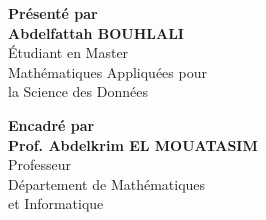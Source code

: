 \documentclass[12pt,a4paper]{report}
\begin{document}
\begin{titlepage}
    \begin{center}
        \begin{minipage}[t]{0.4\textwidth}
            \centering
            \colorbox{lightblue!30}{
                \begin{minipage}{0.9\textwidth}
                    \centering
                    \vspace{0.3cm}
                    \textbf{\color{blueuniv}Présenté par}\\
                    \vspace{0.2cm}
                    {\large \textbf{Abdelfattah BOUHLALI}}\\
                    \vspace{0.1cm}
                    \small Étudiant en Master\\
                    Mathématiques Appliquées pour\\
                    la Science des Données\\
                    \vspace{0.3cm}
                \end{minipage}
            }
        \end{minipage}%
        \hfill
        \begin{minipage}[t]{0.4\textwidth}
            \centering
            \colorbox{blueuniv!10}{
                \begin{minipage}{0.9\textwidth}
                    \centering
                    \vspace{0.3cm}
                    \textbf{\color{blueuniv}Encadré par}\\
                    \vspace{0.2cm}
                    {\large \textbf{Prof. Abdelkrim EL MOUATASIM}}\\
                    \vspace{0.1cm}
                    \small Professeur\\
                    Département de Mathématiques\\
                    et Informatique\\
                    \vspace{0.3cm}
                \end{minipage}
            }
        \end{minipage}
    \end{center}

    \vspace{0.5cm}


\end{titlepage}
\end{document}
